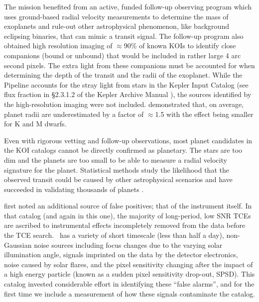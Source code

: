 {\color{blue}
The \Kepler{} mission benefited from an active, funded follow-up observing program which uses ground-based radial velocity measurements to determine the mass of exoplanets \citep[e.g.][]{Marcy2014} and rule-out other astrophysical phenomenon, like background eclipsing binaries, that can mimic a transit signal.  The follow-up program also obtained high resolution imaging of $\approx$90\% of known KOIs \citep[e.g.,][]{Furlan2017} to identify close companions (bound or unbound) that would be included in  rather large 4 arc\,second pixels.  The extra light from these companions must be accounted for when determining the depth of the transit and the radii of the exoplanet.  While the \Kepler{} Pipeline accounts for the stray light from stars in the Kepler Input Catalog \citep{Brown2011} (see flux fraction in \S2.3.1.2 of the Kepler Archive Manual \citet{Thompson2014}), the sources identified by the high-resolution imaging were not included. \citet{Ciardi2015} demonstrated that, on average, planet radii are underestimated by a factor of $\approx$1.5 with the effect being smaller for K and M dwarfs.  
}


Even with rigorous vetting and follow-up observations, most planet candidates in the KOI catalogs cannot be directly confirmed as planetary. The stars are too dim and the planets are too small to be able to measure a radial velocity signature for the planet.   Statistical methods study the likelihood that the observed transit could be caused by other astrophysical scenarios and have succeeded in validating thousands of \Kepler{} planets \citep[e.g.][]{Morton2016, Torres2015,Lissauer2014, Rowe2014}.  

\citet{Mullally2015cat} first noted an additional source of false positives; that of the instrument itself. In that catalog (and again in this one), the majority of long-period, low SNR TCEs are ascribed to instrumental effects incompletely removed from the data before the TCE search. \Kepler\ has a variety of short timescale (less than half a day), non-Gaussian noise sources including focus changes due to the varying solar illumination angle, signals imprinted on the data by the detector electronics, noise caused by solar flares, and the pixel sensitivity changing after the impact of a high energy particle (known as a sudden pixel sensitivity drop-out, SPSD). This catalog invested considerable effort in identifying these ``false alarms'', and for the first time we include a measurement of how these signals contaminate the catalog.

